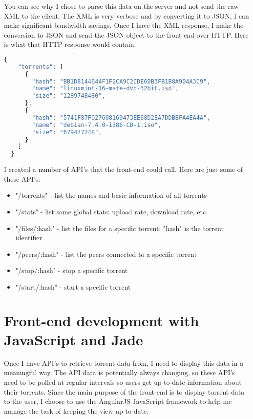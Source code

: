 You can see why I chose to parse this data on the server and not send the raw XML to the client. The XML is very verbose and by converting it to JSON, I can make significant bandwidth savings. Once I have the XML response, I make the conversion to JSON and send the JSON object to the front-end over HTTP. Here is what that HTTP response would contain:
\vspace{10px}
\begin{lstlisting}[caption=XML-RPC response converted to JSON, language=JavaScript]
  {
    "torrents": [
      {
        "hash": "BB1D8144644F1F2CA9C2CDE60B3FB1B8A904A3C9",
        "name": "linuxmint-16-mate-dvd-32bit.iso",
        "size": "1289748480",
      },
      {
        "hash": "5741F87F027608169473EE68D2EA7DDBBFA4EA4A",
        "name": "debian-7.4.0-i386-CD-1.iso",
        "size": "679477248",
      }
    ]
  }
\end{lstlisting}

I created a number of API's that the front-end could call. Here are just some of these API's:

\begin{itemize}
	\item "/torrents" - list the names and basic information of all torrents
	\item "/stats" - list some global stats: upload rate, download rate, etc.
	\item "/files/:hash" - list the files for a specific torrent: "hash" is the torrent identifier
	\item "/peers/:hash" - list the peers connected to a specific torrent
	\item "/stop/:hash" - stop a specific torrent
	\item "/start/:hash" - start a specific torrent
\end{itemize}


\section{Front-end development with JavaScript and Jade}
Once I have API's to retrieve torrent data from, I need to display this data in a meaningful way. The API data is potentially always changing, so these API's need to be polled at regular intervals so users get up-to-date information about their torrents. Since the main purpose of the front-end is to display torrent data to the user, I choose to use the AngularJS JavaScript framework to help me manage the task of keeping the view up-to-date. 

